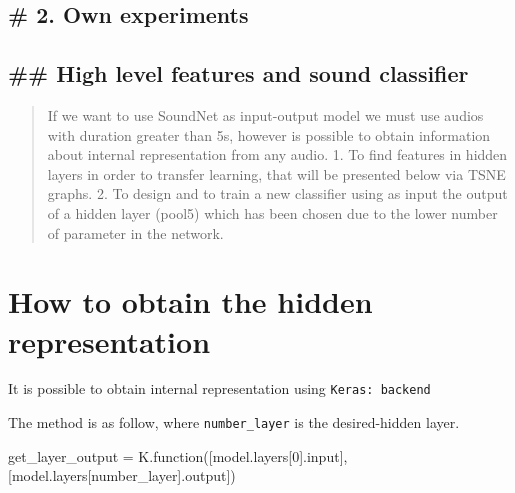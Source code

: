 \documentclass[11pt]{article}
\newenvironment{Shaded}{}{}
\newcommand{\DecValTok}[1]{\textcolor[rgb]{0.25,0.63,0.44}{{#1}}}
\newcommand{\NormalTok}[1]{{#1}}
\newcommand{\OperatorTok}[1]{\textcolor[rgb]{0.40,0.40,0.40}{{#1}}}
\newcommand{\BuiltInTok}[1]{{#1}}
\begin{document}
    \subsection{\# 2. Own experiments}\label{own-experiments}

\subsection{\#\# High level features and sound
classifier}\label{high-level-features-and-sound-classifier}

\begin{quote}
If we want to use SoundNet as input-output model we must use audios with
duration greater than 5s, however is possible to obtain information
about internal representation from any audio. 1. To find features in
hidden layers in order to transfer learning, that will be presented
below via TSNE graphs. 2. To design and to train a new classifier using
as input the output of a hidden layer (pool5) which has been chosen due
to the lower number of parameter in the network.
\end{quote}

    \section{How to obtain the hidden
representation}\label{how-to-obtain-the-hidden-representation}

It is possible to obtain internal representation using
\texttt{Keras:\ backend}

The method is as follow, where \texttt{number\_layer} is the
desired-hidden layer.

\begin{Shaded}
\begin{Highlighting}[]
\NormalTok{get_layer_output }\OperatorTok{=}\NormalTok{ K.function([model.layers[}\DecValTok{0}\NormalTok{].}\BuiltInTok{input}\NormalTok{],}
\NormalTok{                               [model.layers[number_layer].output])}
\end{Highlighting}
\end{Shaded}
\end{document}

